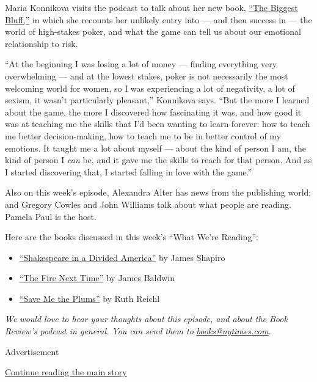 Maria Konnikova visits the podcast to talk about her new book,
\href{https://www.nytimes.com/2020/06/23/books/review/maria-konnikova-the-biggest-bluff.html}{``The
Biggest Bluff,''} in which she recounts her unlikely entry into --- and
then success in --- the world of high-stakes poker, and what the game
can tell us about our emotional relationship to risk.

``At the beginning I was losing a lot of money --- finding everything
very overwhelming --- and at the lowest stakes, poker is not necessarily
the most welcoming world for women, so I was experiencing a lot of
negativity, a lot of sexism, it wasn't particularly pleasant,''
Konnikova says. ``But the more I learned about the game, the more I
discovered how fascinating it was, and how good it was at teaching me
the skills that I'd been wanting to learn forever: how to teach me
better decision-making, how to teach me to be in better control of my
emotions. It taught me a lot about myself --- about the kind of person I
am, the kind of person I \emph{can} be, and it gave me the skills to
reach for that person. And as I started discovering that, I started
falling in love with the game.''

Also on this week's episode, Alexandra Alter has news from the
publishing world; and Gregory Cowles and John Williams talk about what
people are reading. Pamela Paul is the host.

Here are the books discussed in this week's ``What We're Reading'':

\begin{itemize}
\item
  \href{https://www.nytimes.com/2020/03/11/books/review/shakespeare-in-a-divided-america-james-shapiro.html}{``Shakespeare
  in a Divided America''} by James Shapiro
\item
  \href{https://www.nytimes.com/2017/12/25/books/review/james-baldwin-fire-next-time.html}{``The
  Fire Next Time''} by James Baldwin
\item
  \href{https://www.nytimes.com/2019/04/09/books/review/ruth-reichl-save-me-the-plums.html}{``Save
  Me the Plums''} by Ruth Reichl
\end{itemize}

\emph{We would love to hear your thoughts about this episode, and about
the Book Review's podcast in general. You can send them to}
\href{mailto:books@nytimes.com}{\emph{books@nytimes.com}}\emph{.}

Advertisement

\protect\hyperlink{after-bottom}{Continue reading the main story}

